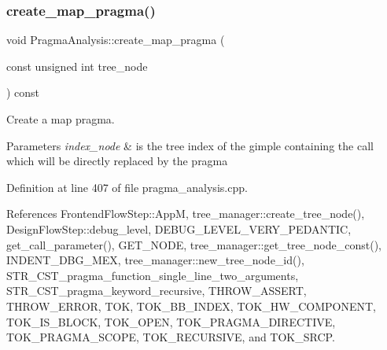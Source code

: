 \mbox{\label{classPragmaAnalysis_a61f2585acbea186f129a12e0cc7ef7d0}} 
\subsubsection{\texorpdfstring{create\+\_\+map\+\_\+pragma()}{create\_map\_pragma()}}
{\footnotesize\ttfamily void Pragma\+Analysis\+::create\+\_\+map\+\_\+pragma (\begin{DoxyParamCaption}\item[{const unsigned int}]{tree\+\_\+node }\end{DoxyParamCaption}) const\hspace{0.3cm}{\ttfamily [private]}}



Create a map pragma. 


\begin{DoxyParams}{Parameters}
{\em index\+\_\+node} & is the tree index of the gimple containing the call which will be directly replaced by the pragma \\
\hline
\end{DoxyParams}


Definition at line 407 of file pragma\+\_\+analysis.\+cpp.



References Frontend\+Flow\+Step\+::\+AppM, tree\+\_\+manager\+::create\+\_\+tree\+\_\+node(), Design\+Flow\+Step\+::debug\+\_\+level, D\+E\+B\+U\+G\+\_\+\+L\+E\+V\+E\+L\+\_\+\+V\+E\+R\+Y\+\_\+\+P\+E\+D\+A\+N\+T\+IC, get\+\_\+call\+\_\+parameter(), G\+E\+T\+\_\+\+N\+O\+DE, tree\+\_\+manager\+::get\+\_\+tree\+\_\+node\+\_\+const(), I\+N\+D\+E\+N\+T\+\_\+\+D\+B\+G\+\_\+\+M\+EX, tree\+\_\+manager\+::new\+\_\+tree\+\_\+node\+\_\+id(), S\+T\+R\+\_\+\+C\+S\+T\+\_\+pragma\+\_\+function\+\_\+single\+\_\+line\+\_\+two\+\_\+arguments, S\+T\+R\+\_\+\+C\+S\+T\+\_\+pragma\+\_\+keyword\+\_\+recursive, T\+H\+R\+O\+W\+\_\+\+A\+S\+S\+E\+RT, T\+H\+R\+O\+W\+\_\+\+E\+R\+R\+OR, T\+OK, T\+O\+K\+\_\+\+B\+B\+\_\+\+I\+N\+D\+EX, T\+O\+K\+\_\+\+H\+W\+\_\+\+C\+O\+M\+P\+O\+N\+E\+NT, T\+O\+K\+\_\+\+I\+S\+\_\+\+B\+L\+O\+CK, T\+O\+K\+\_\+\+O\+P\+EN, T\+O\+K\+\_\+\+P\+R\+A\+G\+M\+A\+\_\+\+D\+I\+R\+E\+C\+T\+I\+VE, T\+O\+K\+\_\+\+P\+R\+A\+G\+M\+A\+\_\+\+S\+C\+O\+PE, T\+O\+K\+\_\+\+R\+E\+C\+U\+R\+S\+I\+VE, and T\+O\+K\+\_\+\+S\+R\+CP.



